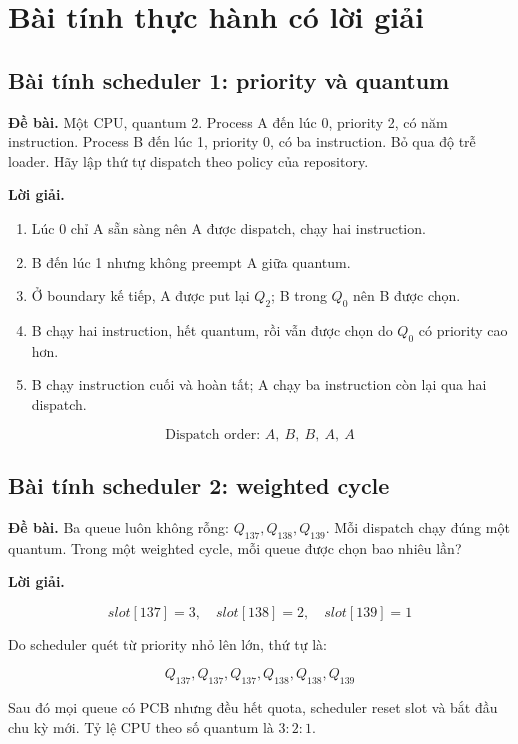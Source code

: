 \documentclass[12pt,a4paper]{article}
\begin{document}
\section{Bài tính thực hành có lời giải}

\subsection{Bài tính scheduler 1: priority và quantum}

\textbf{Đề bài.} Một CPU, quantum 2. Process A đến lúc 0, priority 2, có năm
instruction. Process B đến lúc 1, priority 0, có ba instruction. Bỏ qua độ trễ
loader. Hãy lập thứ tự dispatch theo policy của repository.

\textbf{Lời giải.}

\begin{enumerate}
  \item Lúc 0 chỉ A sẵn sàng nên A được dispatch, chạy hai instruction.
  \item B đến lúc 1 nhưng không preempt A giữa quantum.
  \item Ở boundary kế tiếp, A được put lại \(Q_2\); B trong \(Q_0\) nên B được
  chọn.
  \item B chạy hai instruction, hết quantum, rồi vẫn được chọn do \(Q_0\) có
  priority cao hơn.
  \item B chạy instruction cuối và hoàn tất; A chạy ba instruction còn lại
  qua hai dispatch.
\end{enumerate}

\[
\text{Dispatch order: } A,\ B,\ B,\ A,\ A
\]

\subsection{Bài tính scheduler 2: weighted cycle}

\textbf{Đề bài.} Ba queue luôn không rỗng: \(Q_{137},Q_{138},Q_{139}\).
Mỗi dispatch chạy đúng một quantum. Trong một weighted cycle, mỗi queue được
chọn bao nhiêu lần?

\textbf{Lời giải.}

\[
slot[137]=3,\quad slot[138]=2,\quad slot[139]=1
\]

Do scheduler quét từ priority nhỏ lên lớn, thứ tự là:

\[
Q_{137},Q_{137},Q_{137},Q_{138},Q_{138},Q_{139}
\]

Sau đó mọi queue có PCB nhưng đều hết quota, scheduler reset slot và bắt đầu
chu kỳ mới. Tỷ lệ CPU theo số quantum là \(3:2:1\).
\end{document}
